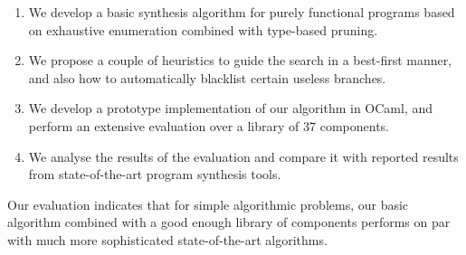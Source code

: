 \begin{enumerate}
\item We develop a basic synthesis algorithm for purely functional programs based on exhaustive enumeration combined with type-based pruning.

\item We propose a couple of heuristics to guide the search in a best-first manner, and also how to automatically blacklist certain useless branches.

\item We develop a prototype implementation of our algorithm in OCaml, and perform an extensive evaluation over a library of 37 components.

\item We analyse the results of the evaluation and compare it with reported results from state-of-the-art program synthesis tools.
\end{enumerate}  

Our evaluation indicates that for simple algorithmic problems, our basic algorithm combined with a good enough library of components performs on par with much more sophisticated state-of-the-art algorithms.
